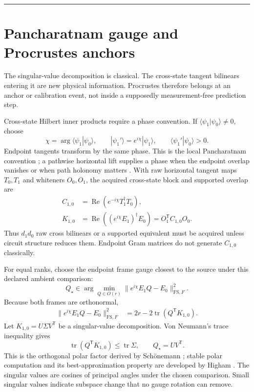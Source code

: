 \documentclass[10pt,twocolumn]{article}
\theoremstyle{definition}
\theoremstyle{remark}
\newcommand{\conceptbreak}{\par\vspace{0.45em}\noindent\textcolor{navy!55}{\rule{\columnwidth}{0.35pt}}\vspace{0.35em}\par}
\newcommand{\Rea}{\operatorname{Re}}
\newcommand{\tr}{\operatorname{tr}}
\newcommand{\FS}{\mathrm{FS}}
\begin{document}
\conceptbreak

\section{Pancharatnam gauge and Procrustes anchors}
\label{sec:procrustes}

\begin{microbox}
The singular-value decomposition is classical.  The cross-state tangent bilinears entering it are new physical information.  Procrustes therefore belongs at an anchor or calibration event, not inside a supposedly measurement-free prediction step.
\end{microbox}

Cross-state Hilbert inner products require a phase convention.  If $\langle\psi_1|\psi_0\rangle\ne0$, choose
\begin{equation}
 \chi=\arg\langle\psi_1|\psi_0\rangle,\qquad
 |\psi_1'\rangle=e^{i\chi}|\psi_1\rangle,\qquad
 \langle\psi_1'|\psi_0\rangle>0.
 \label{eq:pancharatnam}
\end{equation}
Endpoint tangents transform by the same phase.  This is the local Pancharatnam convention \cite{Pancharatnam1956}; a pathwise horizontal lift supplies a phase when the endpoint overlap vanishes or when path holonomy matters \cite{Berry1984,Simon1983}.  With raw horizontal tangent maps $T_0,T_1$ and whiteners $O_0,O_1$, the acquired cross-state block and supported overlap are
\begin{align}
 C_{1,0}&=\Rea\!\left(e^{-i\chi}T_1^\dagger T_0\right),\nonumber\\
 K_{1,0}&=\Rea\!\left((e^{i\chi}E_1)^\dagger E_0\right)
 =O_1^{\mathsf T}C_{1,0}O_0.
 \label{eq:crossraw}
\end{align}
Thus $d_1d_0$ raw cross bilinears or a supported equivalent must be acquired unless circuit structure reduces them.  Endpoint Gram matrices do not generate $C_{1,0}$ classically.

For equal ranks, choose the endpoint frame gauge closest to the source under this declared ambient comparison:
\begin{equation}
 Q_\star\in\arg\min_{Q\in O(r)}
 \|e^{i\chi}E_1Q-E_0\|_{\FS,F}^2.
 \label{eq:procrustesproblem}
\end{equation}
Because both frames are orthonormal,
\begin{align}
 \|e^{i\chi}E_1Q-E_0\|_{\FS,F}^2
 &=2r-2\tr(Q^{\mathsf T}K_{1,0}).
 \label{eq:procrustesexpand}
\end{align}
Let $K_{1,0}=U\Sigma V^{\mathsf T}$ be a singular-value decomposition.  Von Neumann's trace inequality gives
\begin{equation}
 \tr(Q^{\mathsf T}K_{1,0})\le\tr\Sigma,\qquad
 Q_\star=UV^{\mathsf T}.
 \label{eq:procrustessolution}
\end{equation}
This is the orthogonal polar factor derived by Sch\"onemann \cite{Schonemann1966}; stable polar computation and its best-approximation property are developed by Higham \cite{Higham1986}.  The singular values are cosines of principal angles under the chosen comparison.  Small singular values indicate subspace change that no gauge rotation can remove.
\end{document}
